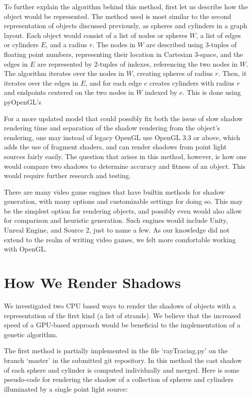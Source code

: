 \documentclass[10pt]{article}
\begin{document}
To further explain the algorithm behind this method, first let us describe how the object would be represented.  The method used is most similar to the second representation of objects discussed previously, as spheres and cylinders in a graph layout.  Each object would consist of a list of nodes or spheres $W$, a list of edges or cylinders $E$, and a radius $r$.  The nodes in $W$ are described using 3-tuples of floating point numbers, representing their location in Cartesian 3-space, and the edges in $E$ are represented by 2-tuples of indexes, referencing the two nodes in $W$.  The algorithm iterates over the nodes in $W$, creating spheres of radius $r$.  Then, it iterates over the edges in $E$, and for each edge $e$ creates cylinders with radius $r$ and endpoints centered on the two nodes in $W$ indexed by $e$.  This is done using pyOpenGL's 

For a more updated model that could possibly fix both the issue of slow shadow rendering time and separation of the shadow rendering from the object's rendering, one may instead of legacy OpenGL use OpenGL 3.3 or above, which adds the use of fragment shaders, and can render shadows from point light sources fairly easily.  The question that arises in this method, however, is how one would compare two shadows to determine accuracy and fitness of an object.  This would require further research and testing.

There are many video game engines that have builtin methods for shadow generation, with many options and customizable settings for doing so.  This may be the simplest option for rendering objects, and possibly even would also allow for comparison and heuristic generation.  Such engines would include Unity, Unreal Engine, and Source 2, just to name a few.  As our knowledge did not extend to the realm of writing video games, we felt more comfortable working with OpenGL.

\section{How We Render Shadows}
We investigated two CPU based ways to render the shadows of objects with a representation of the first kind (a list of strands). We believe that the increased speed of a GPU-based approach would be beneficial to the implementation of a genetic algorithm.

The first method is partially implemented in the file `rayTracing.py' on the branch `master' in the submitted git repository. In this method the cast shadow of each sphere and cylinder is computed individually and merged. Here is some pseudo-code for rendering the shadow of a collection of spheres and cylinders illuminated by a single point light source:
\end{document}
